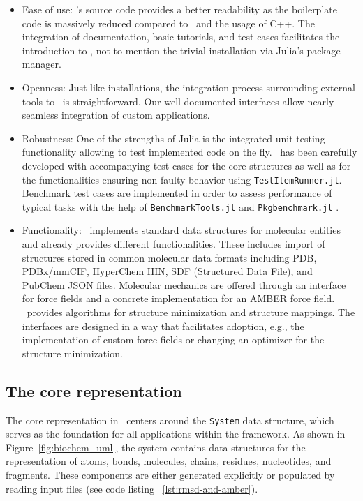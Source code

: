 \begin{itemize}
	\item Ease of use: \biochem's source code provides a better readability as the boilerplate code is massively reduced compared to \ball\ and the usage of C++. The integration of documentation, basic tutorials, and test cases facilitates the introduction to \biochem, not to mention the trivial installation via Julia's package manager. 
	
	\item Openness: Just like installations, the integration process surrounding external tools to \biochem\ is straightforward. Our well-documented interfaces allow nearly seamless integration of custom applications. 
	
	\item Robustness: One of the strengths of Julia is the integrated unit testing functionality allowing to test implemented code on the fly. \biochem\ has been carefully developed with accompanying test cases for the core structures as well as for the functionalities ensuring non-faulty behavior using \texttt{TestItemRunner.jl}\cite{TestItemRunner}. Benchmark test cases are implemented in order to assess performance of typical tasks with the help of \texttt{BenchmarkTools.jl} and \texttt{Pkgbenchmark.jl} \cite{BenchmarkTools.jl-2016, PkgBenchmark}. 
	
	\item Functionality: \biochem\ implements standard data structures for molecular entities and already provides different functionalities. These includes import of structures stored in common molecular data formats including PDB, PDBx/mmCIF, HyperChem HIN, SDF (Structured Data File), and PubChem JSON files. Molecular mechanics are offered through an interface for force fields and a concrete implementation for an AMBER force field. \biochem\ provides algorithms for structure minimization and structure mappings. The interfaces are designed in a way that facilitates adoption, e.g., the implementation of custom force fields or changing an optimizer for the structure minimization. 
\end{itemize}


\subsection{The core representation}

The core representation in \biochem\ centers around the \texttt{System} data structure, which serves as the foundation for all applications within the framework. As shown in Figure~\ref{fig:biochem_uml}, the system contains data structures for the representation of atoms, bonds, molecules, chains, residues, nucleotides, and fragments. These components are either generated explicitly or populated by reading input files (see code listing ~\ref{lst:rmsd-and-amber}). \\

